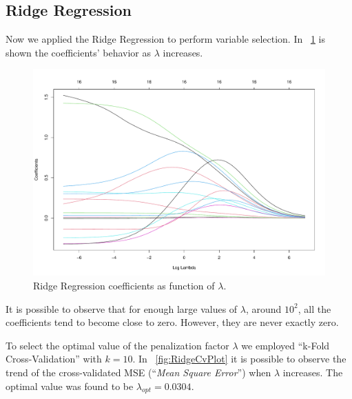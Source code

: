 \subsection{Ridge Regression}

Now we applied the Ridge Regression to perform variable selection. In \Fig~\ref{fig:RidgeCoefVsLambda} is shown the coefficients' behavior as $\lambda$ increases. 

\begin{figure}[h]
	\centering
	\includegraphics[width=0.4\linewidth]{ImageFiles/Regression/Ridge/RidgeCoefVsLambda}
	\caption{Ridge Regression coefficients as function of $\lambda$.}
	\label{fig:RidgeCoefVsLambda}
\end{figure}

It is possible to observe that for enough large values of $\lambda$, around $10^2$, all the coefficients tend to become close to zero. However, they are never exactly zero.

To select the optimal value of the penalization factor $\lambda$ we employed ``k-Fold Cross-Validation'' with $k=10$. In \Fig~\ref{fig:RidgeCvPlot} it is possible to observe the trend of the cross-validated MSE (``\textit{Mean Square Error}'') when $\lambda$ increases. The optimal value was found to be $\lambda_{opt} = 0.0304$.

